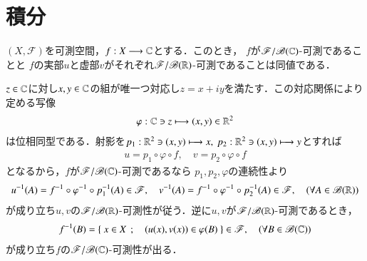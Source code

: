 \section{積分}
	\begin{screen}
		\begin{thm}[複素数値関数の可測性]\label{thm:measurability_of_complex_measurable_functions}
			$(X,\mathscr{F})$を可測空間，$f:X \longrightarrow \mathbb{C}$とする．このとき，
			$f$が$\mathscr{F}/\mathscr{B}(\mathbb{C})$-可測であることと
			$f$の実部$u$と虚部$v$がそれぞれ$\mathscr{F}/\mathscr{B}(\mathbb{R})$-可測であることは同値である．
		\end{thm}
	\end{screen}
	
	\begin{prf}
		$z \in \mathbb{C}$に対し$x,y \in \mathbb{C}$の組が唯一つ対応し$z = x + i y$を満たす．この対応関係により定める写像
		\begin{align}
			\varphi:\mathbb{C} \ni z \longmapsto (x,y) \in \mathbb{R}^2
		\end{align}
		は位相同型である．射影を$p_1:\mathbb{R}^2 \ni (x,y) \longmapsto x,
		\ p_2:\mathbb{R}^2 \ni (x,y) \longmapsto y$とすれば
		\begin{align}
			u = p_1 \circ \varphi \circ f,
			\quad v = p_2 \circ \varphi \circ f
		\end{align}
		となるから，$f$が$\mathscr{F}/\mathscr{B}(\mathbb{C})$-可測であるなら
		$p_1,p_2,\varphi$の連続性より
		\begin{align}
			u^{-1}(A) = f^{-1} \circ \varphi^{-1} \circ p_1^{-1}(A) \in \mathscr{F},
			\quad v^{-1}(A) = f^{-1} \circ \varphi^{-1} \circ p_2^{-1}(A) \in \mathscr{F},
			\quad (\forall A \in \mathscr{B}(\mathbb{R}))
		\end{align}
		が成り立ち$u,v$の$\mathscr{F}/\mathscr{B}(\mathbb{R})$-可測性が従う．逆に$u,v$が$\mathscr{F}/\mathscr{B}(\mathbb{R})$-可測であるとき，
		\begin{align}
			f^{-1}(B) = \left\{\ x \in X\ \, ; \quad (u(x),v(x)) \in \varphi(B)\ \right\} \in \mathscr{F},
			\quad (\forall B \in \mathscr{B}(\mathbb{C}))
		\end{align}
		が成り立ち$f$の$\mathscr{F}/\mathscr{B}(\mathbb{C})$-可測性が出る．
		\QED
	\end{prf}
	
	\begin{screen}
		\begin{thm}[和・積・商の可測性]
			
		\end{thm}
	\end{screen}
	
